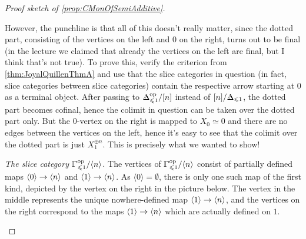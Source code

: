 \begin{proof}[Proof sketch of \cref{prop:CMonOfSemiAdditive}]
\begin{center}
	\end{center}
	However, the punchline is that all of this doesn't really matter, since the dotted part, consisting of the vertices on the left and $0$ on the right, turns out to be final (in the lecture we claimed that already the vertices on the left are final, but I think that's not true). To prove this, verify the criterion from \cref{thm:JoyalQuillenThmA} and use that the slice categories in question (in fact, slice categories between slice categories) contain the respective arrow starting at $0$ as a terminal object. After passing to $\IDelta_{\leq 1}^\op/[n]$ instead of $[n]/\IDelta_{\leq 1}$, the dotted part becomes cofinal, hence the colimit in question can be taken over the dotted part only. But the $0$-vertex on the right is mapped to $X_0\simeq 0$ and there are no edges between the vertices on the left, hence it's easy to see that the colimit over the dotted part is just $X_1^{\oplus n}$. This is precisely what we wanted to show!
	
	\emph{The slice category $\IGamma^\op_{\leq 1}/\langle n\rangle$.} The vertices of $\IGamma^\op_{\leq 1}/\langle n\rangle$ consist of partially defined maps $\langle 0\rangle \morphism\langle n\rangle$ and $\langle 1\rangle \morphism\langle n\rangle$. As $\langle 0\rangle=\emptyset$, there is only one such map of the first kind, depicted by the vertex on the right in the picture below. The vertex in the middle represents the unique nowhere-defined map $\langle 1\rangle\morphism \langle n\rangle$, and the vertices on the right correspond to the maps $\langle 1\rangle\morphism \langle n\rangle$ which are actually defined on $1$.
	\begin{center}
		

\end{center}
\end{proof}

